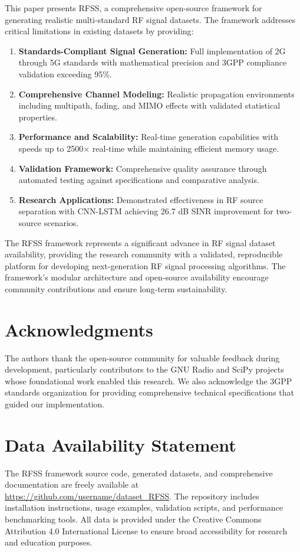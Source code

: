 \documentclass[twocolumn,10pt]{article}
\begin{document}
This paper presents RFSS, a comprehensive open-source framework for generating realistic multi-standard RF signal datasets. The framework addresses critical limitations in existing datasets by providing:

\begin{enumerate}
\item \textbf{Standards-Compliant Signal Generation:} Full implementation of 2G through 5G standards with mathematical precision and 3GPP compliance validation exceeding 95\%.

\item \textbf{Comprehensive Channel Modeling:} Realistic propagation environments including multipath, fading, and MIMO effects with validated statistical properties.

\item \textbf{Performance and Scalability:} Real-time generation capabilities with speeds up to 2500$\times$ real-time while maintaining efficient memory usage.

\item \textbf{Validation Framework:} Comprehensive quality assurance through automated testing against specifications and comparative analysis.

\item \textbf{Research Applications:} Demonstrated effectiveness in RF source separation with CNN-LSTM achieving 26.7 dB SINR improvement for two-source scenarios.
\end{enumerate}

The RFSS framework represents a significant advance in RF signal dataset availability, providing the research community with a validated, reproducible platform for developing next-generation RF signal processing algorithms. The framework's modular architecture and open-source availability encourage community contributions and ensure long-term sustainability.

\section*{Acknowledgments}

The authors thank the open-source community for valuable feedback during development, particularly contributors to the GNU Radio and SciPy projects whose foundational work enabled this research. We also acknowledge the 3GPP standards organization for providing comprehensive technical specifications that guided our implementation.

\section*{Data Availability Statement}

The RFSS framework source code, generated datasets, and comprehensive documentation are freely available at \url{https://github.com/username/dataset_RFSS}. The repository includes installation instructions, usage examples, validation scripts, and performance benchmarking tools. All data is provided under the Creative Commons Attribution 4.0 International License to ensure broad accessibility for research and education purposes.



\end{document}
